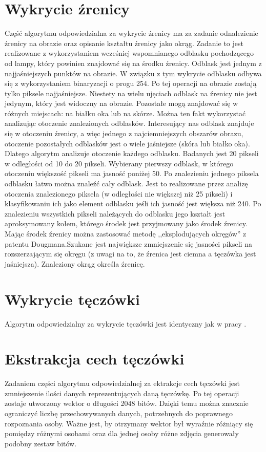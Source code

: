\section{Wykrycie źrenicy}
\label{sec:wykrycieZrenicy}
Część algorytmu odpowiedzialna za wykrycie źrenicy ma za zadanie odnalezienie źrenicy na obrazie oraz opisanie kształtu źrenicy jako okrąg. Zadanie to jest realizowane z wykorzystaniem wcześniej wspomnianego odblasku pochodzącego od lampy, który powinien znajdować się na środku źrenicy. Odblask jest jednym z najjaśniejszych punktów na obrazie. W związku z tym wykrycie odblasku odbywa się z wykorzystaniem binaryzacji o progu 254. Po tej operacji na obrazie zostają tylko piksele najjaśniejsze. Niestety na wielu ujęciach odblask na źrenicy nie jest jedynym, który jest widoczny na obrazie. Pozostałe mogą znajdować się w różnych miejscach: na białku oka lub na skórze. Można ten fakt wykorzystać analizując otoczenie znalezionych odblasków. Interesujący nas odblask znajduje się w otoczeniu źrenicy, a więc jednego z najciemniejszych obszarów obrazu, otoczenie pozostałych odblasków jest o wiele jaśniejsze (skóra lub białko oka). Dlatego algorytm analizuje otoczenie każdego odblasku. Badanych jest 20 pikseli w odległości od 10 do 20 pikseli. Wybierany pierwszy odblask, w którego otoczeniu większość pikseli ma jasność poniżej 50. Po znalezieniu jednego piksela odblasku łatwo można znaleźć cały odblask. Jest to realizowane przez analizę otoczenia znalezionego piksela (w odległości nie większej niż 25 pikseli) i klasyfikowaniu ich jako element odblasku jeśli ich jasność jest większa niż 240. Po znalezieniu wszystkich pikseli należących do odblasku jego kształt jest aproksymowany kołem, którego środek jest przyjmowany jako środek źrenicy. Mając środek źrenicy można zastosować metodę ,,eksplodujących okręgów'' z patentu Dougmana.Szukane jest największe zmniejszenie się jasności pikseli na rozszerzającym się okręgu (z uwagi na to, że źrenica jest ciemna a tęczówka jest jaśniejsza). Znaleziony okrąg określa źrenicę.

\section{Wykrycie tęczówki}
\label{sec:wykrycieTeczowki}
Algorytm odpowiedzialny za wykrycie tęczówki jest identyczny jak w pracy \cite{Gl11}.

\section{Ekstrakcja cech tęczówki}
\label{sec:ekstrakcja}
Zadaniem części algorytmu odpowiedzialnej za ektrakcje cech tęczówki jest zmniejszenie ilości danych reprezentujących daną tęczówkę. Po tej operacji zostaje utworzony wektor o długości 2048 bitów. Dzięki temu można znacznie ograniczyć liczbę przechowywanych danych, potrzebnych do poprawnego rozpoznania osoby. Ważne jest, by otrzymany wektor był wyraźnie różniący się pomiędzy różnymi osobami oraz dla jednej osoby różne zdjęcia generowały podobny zestaw bitów. 

